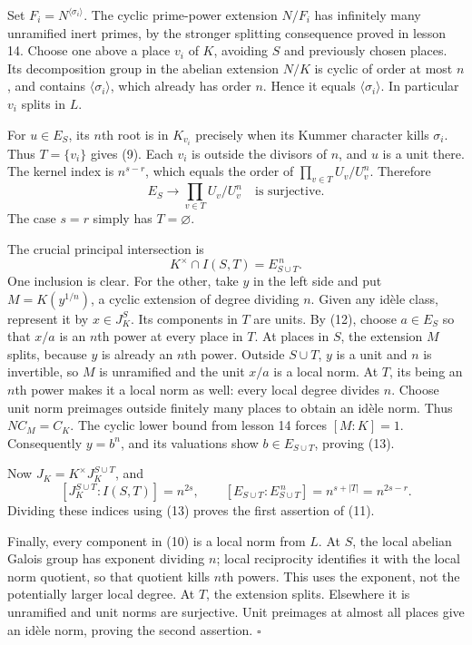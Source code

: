 \documentclass[11pt,a4paper]{article}
\begin{document}
Set \(F_i=N^{\langle\sigma_i\rangle}\). The cyclic prime-power extension
\(N/F_i\) has infinitely many unramified inert primes, by the stronger
splitting consequence proved in lesson 14. Choose one above a place
\(v_i\) of \(K\), avoiding \(S\) and previously chosen places. Its
decomposition group in the abelian extension \(N/K\) is cyclic of order
at most \(n\), and contains \(\langle\sigma_i\rangle\), which already
has order \(n\). Hence it equals \(\langle\sigma_i\rangle\). In
particular \(v_i\) splits in \(L\).

For \(u\in E_S\), its \(n\)th root is in \(K_{v_i}\) precisely when its
Kummer character kills \(\sigma_i\). Thus \(T=\{v_i\}\) gives (9). Each
\(v_i\) is outside the divisors of \(n\), and \(u\) is a unit there. The
kernel index is \(n^{s-r}\), which equals the order of
\(\prod_{v\in T}U_v/U_v^n\). Therefore \[
E_S\longrightarrow\prod_{v\in T}U_v/U_v^n
\quad\text{is surjective}.
\tag{12}
\] The case \(s=r\) simply has \(T=\varnothing\).

The crucial principal intersection is \[
K^\times\cap I(S,T)=E_{S\cup T}^{\,n}.
\tag{13}
\] One inclusion is clear. For the other, take \(y\) in the left side
and put \(M=K(y^{1/n})\), a cyclic extension of degree dividing \(n\).
Given any idèle class, represent it by \(x\in J_K^S\). Its components in
\(T\) are units. By (12), choose \(a\in E_S\) so that \(x/a\) is an
\(n\)th power at every place in \(T\). At places in \(S\), the extension
\(M\) splits, because \(y\) is already an \(n\)th power. Outside
\(S\cup T\), \(y\) is a unit and \(n\) is invertible, so \(M\) is
unramified and the unit \(x/a\) is a local norm. At \(T\), its being an
\(n\)th power makes it a local norm as well: every local degree divides
\(n\). Choose unit norm preimages outside finitely many places to obtain
an idèle norm. Thus \(NC_M=C_K\). The cyclic lower bound from lesson 14
forces \([M:K]=1\). Consequently \(y=b^n\), and its valuations show
\(b\in E_{S\cup T}\), proving (13).

Now \(J_K=K^\times J_K^{S\cup T}\), and \[
[J_K^{S\cup T}:I(S,T)]=n^{2s},\qquad
[E_{S\cup T}:E_{S\cup T}^{\,n}]=n^{s+|T|}=n^{2s-r}.
\] Dividing these indices using (13) proves the first assertion of (11).

Finally, every component in (10) is a local norm from \(L\). At \(S\),
the local abelian Galois group has exponent dividing \(n\); local
reciprocity identifies it with the local norm quotient, so that quotient
kills \(n\)th powers. This uses the exponent, not the potentially larger
local degree. At \(T\), the extension splits. Elsewhere it is unramified
and unit norms are surjective. Unit preimages at almost all places give
an idèle norm, proving the second assertion. \(\square\)
\end{document}
